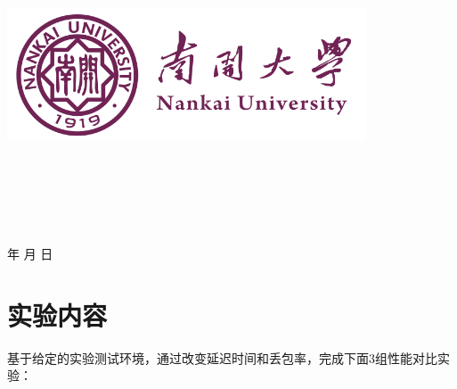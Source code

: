 \documentclass[a4paper]{article}
\begin{document}
\renewcommand{\appendixname}{附录}
\renewcommand{\appendixpagename}{附录}
\renewcommand{\refname}{参考文献} 
\renewcommand{\figurename}{图}
\renewcommand{\tablename}{表}
\renewcommand{\today}{\number\year 年 \number\month 月 \number\day 日}
\newcommand\mydot[1]{\scalebox{#1}{.}}
\renewcommand\cftdot{\mydot{0.8}} %
\renewcommand\cftdotsep{3} %
\begin{titlepage}
    \begin{center}
    \includegraphics[width=0.8\textwidth]{NKU.png}\\[1cm]
    \vspace{20mm}
		\textbf{\huge\textbf{}}\\[0.5cm]
		\textbf{\huge{}}\\[2.3cm]
		\textbf{\Huge\textbf{}}
		\vspace{\fill}

    \centering
    \textsc{\LARGE {}}\\[0.5cm]
    \textsc{\LARGE {}}\\[0.5cm]
    \textsc{\LARGE {}}\\[0.5cm]
    \vfill
    {\Large \today}
    \end{center}
\end{titlepage}

\renewcommand {\thefigure}{\thesection{}.\arabic{figure}}%
\renewcommand{\contentsname}{目录} 

\clearpage
\tableofcontents
\newpage
\section{实验内容}

基于给定的实验测试环境，通过改变延迟时间和丢包率，完成下面3组性能对比实验：
\end{document}

